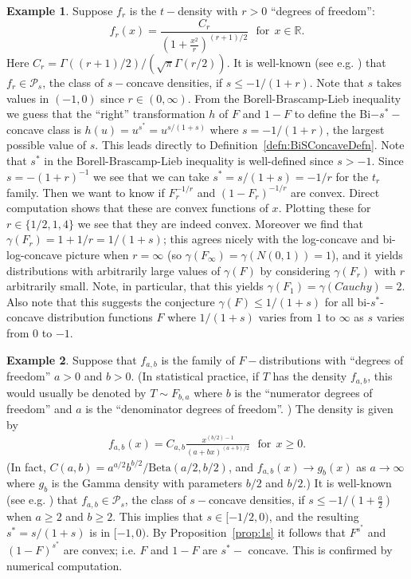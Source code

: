 \documentclass[11pt]{amsart}
\numberwithin{equation}{section}
\newcommand{\RR}{\mathbb{R}}
\theoremstyle{definition}\newtheorem{definition}{Definition}
\theoremstyle{remark}\newtheorem{assumption}{Assumption}
\theoremstyle{remark}\newtheorem{remark}{Remark}
\theoremstyle{definition}\newtheorem{example}{Example}
\theoremstyle{plain}\newtheorem{question}{Question}
\theoremstyle{plain}\newtheorem{theorem}{Theorem}
\theoremstyle{plain}\newtheorem{lemma}{Lemma}
\theoremstyle{plain}\newtheorem{proposition}{Proposition}
\theoremstyle{plain}\newtheorem{corollary}{Corollary}
\theoremstyle{plain}\newtheorem{conjecture}{Conjecture}
\begin{document}
\begin{example}
\label{exmpl:ex1}
Suppose $f_r$ is the $t-$density with $r >0$ ``degrees of freedom'':
$$
f_r (x) = \frac{C_r}{\left (1 + \frac{x^2}{r} \right )^{(r+1)/2}}  \ \ \ \mbox{for} \ \ x \in \RR.
$$
Here $C_r = \Gamma ((r+1)/2)/(\sqrt{\pi} \Gamma (r/2))$.
It is well-known (see e.g. 
\cite{MR0404559}) %
that $f_r \in \mathcal{P}_s$, the class of $s-$concave densities, if $s \le - 1/(1+r)$.
Note that $s$ takes values in $(-1,0)$ since $r \in (0,\infty)$.
From the Borell-Brascamp-Lieb inequality we guess that the ``right'' transformation $h$ of $F$ and $1-F$ to define
the Bi$-s^*-$concave class is  $h(u) = u^{s^*} = u^{s/(1+s)}$ where $s = -1/(1+r)$, the largest possible value of $s$.  
This leads directly to Definition~\ref{defn:BiSConcaveDefn}.     
Note that $s^*$ in the Borell-Brascamp-Lieb inequality is well-defined since $s>-1$.
Since $s = -(1+r)^{-1}$  we see that we can take $s^* = s/(1+s) = -1/r$ for the $t_r$ family.  Then we want to know if 
$F_r^{-1/r}$ and $(1-F_r)^{-1/r}$ are convex.  Direct computation shows that these are convex functions of $x$.
Plotting these for $r \in \{1/2, 1, 4 \}$ we see that they are indeed convex.   
Moreover we find that 
$\gamma (F_r) = 1 + 1/r = 1/(1+s)$;  this agrees nicely with the log-concave and bi-log-concave picture when $r = \infty$ 
(so $\gamma (F_{\infty} ) = \gamma (N(0,1)) = 1$), and it yields distributions with arbitrarily large values of 
$\gamma (F)$ by considering $\gamma (F_r)$ with $r $ arbitrarily small.  Note, in particular, that this yields 
$\gamma (F_1) = \gamma (Cauchy) = 2$.   Also note that this suggests the conjecture
$\gamma (F) \le 1/(1+s) $ for all  bi-$s^*$-concave distribution functions $F$ where $1/(1+s)$ varies from $1$ to $\infty$ 
as $s$ varies from $0$ to $-1$.
\end{example}
\smallskip
 
\begin{example}
\label{exmpl:ex2}
Suppose that $f_{a,b} $ is the family of $F-$distributions with ``degrees of freedom'' $a>0$ and $b>0$.
(In statistical practice, if $T$ has the density $f_{a,b}$, 
this would usually be denoted by $T\sim F_{b,a}$ where $b$ is the ``numerator degrees of freedom''
and $a$ is the ``denominator degrees of freedom''. )
The density is given by 
\begin{eqnarray*}
f_{a,b} (x) = C_{a,b} \frac{x^{(b/2) -1}}{\left ( a + b x \right )^{(a+b)/2} } \ \ \ \mbox{for} \ \ x \ge 0 .
\end{eqnarray*}
(In fact, $C(a,b) = a^{a/2} b^{b/2} / \mbox{Beta} (a/2,b/2)$, and $f_{a,b} (x) \rightarrow g_b (x)$ as $a\rightarrow \infty$ 
where $g_b$ is the Gamma density with  parameters $b/2$ and $b/2$.)
It is well-known (see e.g. 
\cite{MR0404559}) %
that $f_{a,b} \in \mathcal{P}_s$, the class of $s-$concave densities, 
if $s \le  - 1/(1 + \frac{a}{2} )$ when $a \ge 2$ and $b\ge 2$.   This implies that $s \in [-1/2, 0)$, and the 
resulting $s^* = s/(1+s) $ is in $[-1,0)$.  By Proposition~\ref{prop:1s} it follows that 
$F^{s^*}$ and $(1-F)^{s^*}$ are convex; i.e. $F$ and $1-F$ are $s^*-$ concave.  
This is confirmed by numerical computation.  
\end{example}
\end{document}
